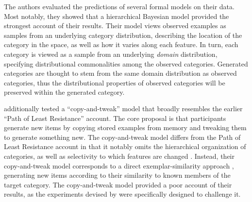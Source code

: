 \documentclass[12pt]{article}
\begin{document}
\begin{flushleft}
The authors evaluated the predictions of several formal models on their data.
Most notably, they showed that a hierarchical Bayesian model provided the
strongest account of their results. Their model views observed examples as
samples from an underlying category distribution, describing the location of the
category in the space, as well as how it varies along each feature. In turn,
each category is viewed as a sample from an underlying {\em domain}
distribution, specifying distributional commonalities among the observed
categories. Generated categories are thought to stem from the same domain
distribution as observed categories, thus the distributional properties of
observed categories will be preserved within the generated category. 

\cite{jern2013probabilistic} additionally tested a ``copy-and-tweak'' model that
broadly resembles the earlier ``Path of Least Resistance'' account. The core
proposal is that participants generate new items by copying stored examples from
memory and tweaking them to generate something new. The copy-and-tweak model
differs from the Path of Least Resistance account in that it notably omits the
hierarchical organization of categories, as well as selectivity to which
features are changed \citep[both of which are factors in the Path of Least
Resistance account;][]{ward2002role}. Instead, their copy-and-tweak model
corresponds to a direct exemplar-similarity approach
\citep[e.g.,][]{nosofsky1984choice,nosofsky1986attention}, generating new items
according to their similarity to known members of the target category. The
copy-and-tweak model provided a poor account of their results, as the
experiments devised by \citeauthor{jern2013probabilistic} were specifically
designed to challenge it. 


\end{flushleft}
\end{document}
